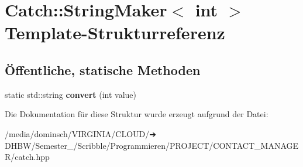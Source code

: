 \hypertarget{structCatch_1_1StringMaker_3_01int_01_4}{}\section{Catch\+:\+:String\+Maker$<$ int $>$ Template-\/\+Strukturreferenz}
\label{structCatch_1_1StringMaker_3_01int_01_4}
\subsection*{Öffentliche, statische Methoden}
\begin{DoxyCompactItemize}
\item 
\mbox{\label{structCatch_1_1StringMaker_3_01int_01_4_aab096e55fb7283f6ad47b5ca277e22e8}} 
static std\+::string {\bfseries convert} (int value)
\end{DoxyCompactItemize}


Die Dokumentation für diese Struktur wurde erzeugt aufgrund der Datei\+:\begin{DoxyCompactItemize}
\item 
/media/dominsch/\+V\+I\+R\+G\+I\+N\+I\+A/\+C\+L\+O\+U\+D/➔ D\+H\+B\+W/\+Semester\+\_/\+Scribble/\+Programmieren/\+P\+R\+O\+J\+E\+C\+T/\+C\+O\+N\+T\+A\+C\+T\+\_\+\+M\+A\+N\+A\+G\+E\+R/catch.\+hpp\end{DoxyCompactItemize}
